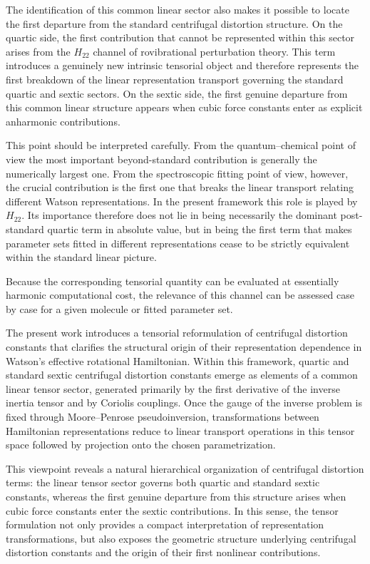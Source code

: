 \documentclass[journal=jacsat,manuscript=article]{achemso}
\begin{document}
The identification of this common linear sector also makes it possible
to locate the first departure from the standard centrifugal distortion
structure.
On the quartic side, the first contribution that cannot be represented
within this sector arises from the $H_{22}$ channel of rovibrational
perturbation theory.
This term introduces a genuinely new intrinsic tensorial object and
therefore represents the first breakdown of the linear representation
transport governing the standard quartic and sextic sectors.
On the sextic side, the first genuine departure from this common linear
structure appears when cubic force constants enter as explicit
anharmonic contributions.

This point should be interpreted carefully.
From the quantum--chemical point of view the most important
beyond-standard contribution is generally the numerically largest one.
From the spectroscopic fitting point of view, however, the crucial
contribution is the first one that breaks the linear transport relating
different Watson representations.
In the present framework this role is played by $H_{22}$.
Its importance therefore does not lie in being necessarily the dominant
post-standard quartic term in absolute value, but in being the first
term that makes parameter sets fitted in different representations cease
to be strictly equivalent within the standard linear picture.

Because the corresponding tensorial quantity can be evaluated at
essentially harmonic computational cost, the relevance of this channel
can be assessed case by case for a given molecule or fitted parameter
set.

The present work introduces a tensorial reformulation of centrifugal
distortion constants that clarifies the structural origin of their
representation dependence in Watson's effective rotational Hamiltonian.
Within this framework, quartic and standard sextic centrifugal
distortion constants emerge as elements of a common linear tensor
sector, generated primarily by the first derivative of the inverse
inertia tensor and by Coriolis couplings. Once the gauge of the inverse
problem is fixed through Moore--Penrose pseudoinversion,
transformations between Hamiltonian representations reduce to linear
transport operations in this tensor space followed by projection onto
the chosen parametrization.

This viewpoint reveals a natural hierarchical organization of
centrifugal distortion terms: the linear tensor sector governs both
quartic and standard sextic constants, whereas the first genuine
departure from this structure arises when cubic force constants enter
the sextic contributions. In this sense, the tensor formulation not
only provides a compact interpretation of representation
transformations, but also exposes the geometric structure underlying
centrifugal distortion constants and the origin of their first
nonlinear contributions.
\end{document}

